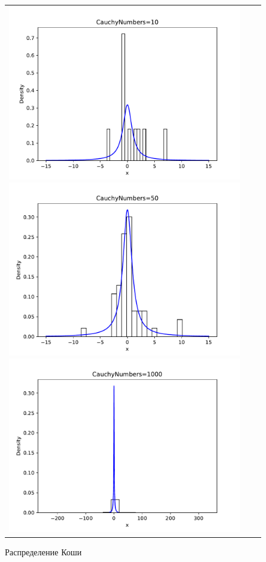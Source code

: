 \begin{figure}[H]
	\begin{tabular}{ccc}
		\includegraphics[scale=0.33]{cauchy_hist_10.pdf}
		\includegraphics[scale=0.33]{cauchy_hist_50.pdf}
		\includegraphics[scale=0.33]{cauchy_hist_1000.pdf}
	\end{tabular}
	\caption{Распределение Коши}
\end{figure}

